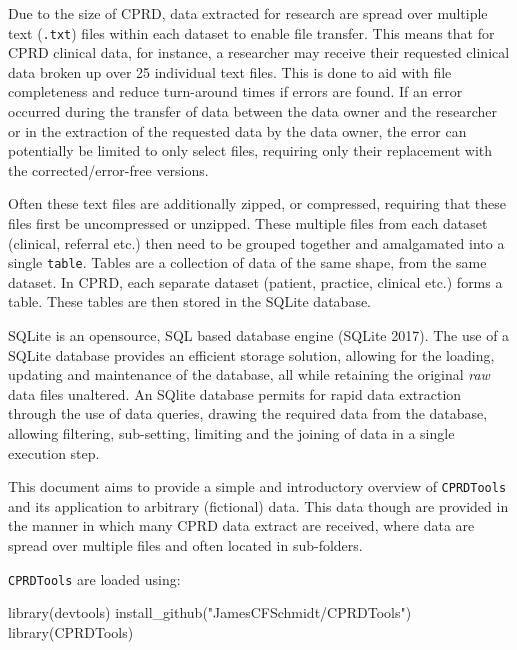 \documentclass[
]{article}
\newenvironment{Shaded}{\begin{snugshade}}{\end{snugshade}}
\newcommand{\FunctionTok}[1]{\textcolor[rgb]{0.00,0.00,0.00}{#1}}
\newcommand{\NormalTok}[1]{#1}
\newcommand{\StringTok}[1]{\textcolor[rgb]{0.31,0.60,0.02}{#1}}
\begin{document}
Due to the size of CPRD, data extracted for research are spread over
multiple text (\texttt{.txt}) files within each dataset to enable file
transfer. This means that for CPRD clinical data, for instance, a
researcher may receive their requested clinical data broken up over 25
individual text files. This is done to aid with file completeness and
reduce turn-around times if errors are found. If an error occurred
during the transfer of data between the data owner and the researcher or
in the extraction of the requested data by the data owner, the error can
potentially be limited to only select files, requiring only their
replacement with the corrected/error-free versions.

Often these text files are additionally zipped, or compressed, requiring
that these files first be uncompressed or unzipped. These multiple files
from each dataset (clinical, referral etc.) then need to be grouped
together and amalgamated into a single \texttt{table}. Tables are a
collection of data of the same shape, from the same dataset. In CPRD,
each separate dataset (patient, practice, clinical etc.) forms a table.
These tables are then stored in the SQLite database.

SQLite is an opensource, SQL based database engine (SQLite 2017). The
use of a SQLite database provides an efficient storage solution,
allowing for the loading, updating and maintenance of the database, all
while retaining the original \emph{raw} data files unaltered. An SQlite
database permits for rapid data extraction through the use of data
queries, drawing the required data from the database, allowing
filtering, sub-setting, limiting and the joining of data in a single
execution step.

This document aims to provide a simple and introductory overview of
\texttt{CPRDTools} and its application to arbitrary (fictional) data.
This data though are provided in the manner in which many CPRD data
extract are received, where data are spread over multiple files and
often located in sub-folders.

\texttt{CPRDTools} are loaded using:

\begin{Shaded}
\begin{Highlighting}[]
\FunctionTok{library}\NormalTok{(devtools)}
\FunctionTok{install\_github}\NormalTok{(}\StringTok{"JamesCFSchmidt/CPRDTools"}\NormalTok{)}
\FunctionTok{library}\NormalTok{(CPRDTools)}
\end{Highlighting}
\end{Shaded}
\end{document}
